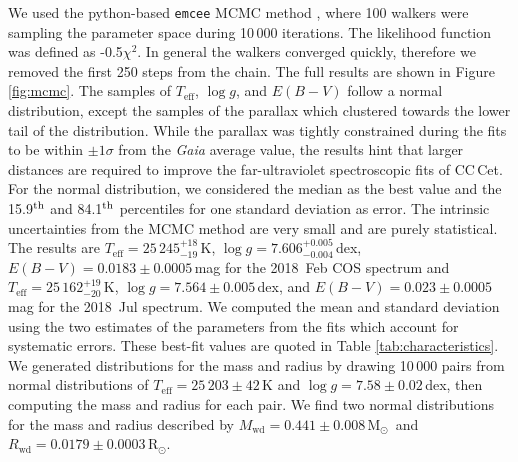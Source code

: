 \documentclass[fleqn,usenatbib]{mnras}
\newcommand{\Rwd}{\mbox{$R_{\mathrm{wd}}$}}
\newcommand{\Mwd}{\mbox{$M_{\mathrm{wd}}$}}
\newcommand{\Msun}{\mbox{$\mathrm{M}_{\odot}$}}
\newcommand{\Rsun}{\mbox{$\mathrm{R}_{\odot}$}}
\newcommand{\Teff}{\mbox{$T_{\mathrm{eff}}$}}
\newcommand{\logg}{\mbox{$\log g$}}
\begin{document}
We used the python-based \texttt{emcee} MCMC method \citep{foreman-mackeyetal13-1}, where 100 walkers were sampling the parameter space during 10\,000 iterations. The likelihood function was defined as -0.5$\chi^{2}$. In general the walkers converged quickly, therefore we removed the first 250 steps from the chain. The full results are shown in Figure \ref{fig:mcmc}. The samples of \Teff, \logg, and $E(B-V)$ follow a normal distribution, except the samples of the parallax which clustered towards the lower tail of the distribution. While the parallax was tightly constrained during the fits to be within $\pm1\sigma$ from the \textit{Gaia} average value, the results hint that larger distances are required to improve the far-ultraviolet spectroscopic fits of CC\,Cet. For the normal distribution, we considered the median as the best value and the 15.9$^{\rm th}$ and 84.1$^{\rm th}$ percentiles for one standard deviation as error. The intrinsic uncertainties from the MCMC method are very small and are purely statistical. The results are $\Teff=25\,245^{+18}_{-19}$\,K, $\logg=7.606^{+0.005}_{-0.004}$\,dex, $E(B-V) = 0.0183\pm0.0005$\,mag for the 2018~Feb COS spectrum and $\Teff=25\,162^{+19}_{-20}$\,K, $\logg=7.564\pm0.005$\,dex, and $E(B-V) =0.023\pm0.0005$\,mag for the 2018~Jul spectrum. We computed the mean and standard deviation using the two estimates of the parameters from the fits which account for systematic errors. These best-fit values are quoted in Table \ref{tab:characteristics}. We generated distributions for the mass and radius by drawing 10\,000 pairs from normal distributions of $\Teff=25\,203\pm42$\,K and $\logg=7.58\pm0.02$\,dex, then computing the mass and radius for each pair. We find two normal distributions for the mass and radius described by $\Mwd=0.441\pm0.008$\,\Msun\ and $\Rwd=0.0179\pm0.0003$\,\Rsun.



\end{document}
